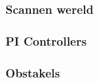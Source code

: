 \subsubsection{Scannen wereld}
\label{subsec: Scannen wereld}


\subsubsection{PI Controllers}
\label{subsec: PI Controllers}


\subsubsection{Obstakels}
\label{subsec: Obstakels}



















